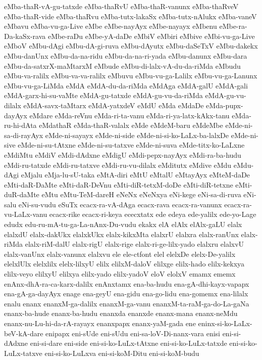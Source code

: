 {eMba-thaR-vA-gu-tatxde
eMba-thaRvU
eMba-thaR-vanunx
eMba-thaRveV
eMba-thaR-vide
eMba-thaRvu
eMba-tutx-lakaSx
eMba-tutx-nAlukx
eMba-vaneV
eMbavu
eMba-vu-ga-Live
eMbe
eMbe-nayAyx
eMbe-nayayx
eMbenu
eMbe-ra-Da-kaSx-rava
eMbe-raDu
eMbe-yA-daDe
eMbiV
eMbiri
eMbive
eMbi-vu-ga-Live
eMboV
eMbu-dAgi
eMbu-dA-gi-ruva
eMbu-dAyutx
eMbu-daSeTxV
eMbu-dakekx
eMbu-danUnx
eMbu-da-na-ridu
eMbu-da-na-ri-yada
eMbu-danunx
eMbu-dara
eMbu-da-satxrX-maMtarxM
eMbude
eMbu-di-lalx-vA-du-da-riMda
eMbudu
eMbu-va-ralilx
eMbu-va-va-ralilx
eMbuvu
eMbu-vu-ga-Lalilx
eMbu-vu-ga-Lanunx
eMbu-vu-ga-LiMda
eMdA
eMdA-du-da-riMda
eMdAga
eMdA-galU
eMdA-gali
eMdA-garx-hi-su-vaMte
eMdA-gu-tatxde
eMdA-gu-vu-da-riMda
eMdA-gu-vu-dilalx
eMdA-savx-taMtarx
eMdA-yatxdeV
eMdU
eMda
eMdaDe
eMda-pupx-dayAyx
eMdare
eMda-reVnu
eMda-ri-ta-vanu
eMda-ri-ya-latx-kAkx-tanu
eMda-ru-hi-dAta
eMdathaR
eMda-thaR-valalx
eMde
eMdeM-baru
eMdeMbe
eMde-ni-sa-di-rayAyx
eMde-ni-sayayx
eMde-ni-side
eMde-ni-si-ko-LaLx-ba-lalxDe
eMde-ni-sive
eMde-ni-su-tAtxne
eMde-ni-su-tatxve
eMde-ni-suva
eMde-titx-ko-LaLxne
eMdiMtu
eMdiV
eMdi-dAdxne
eMdigU
eMdi-pepx-nayAyx
eMdi-ra-ba-hudu
eMdi-ru-tatxde
eMdi-ru-tatxve
eMdi-ru-vu-dilalx
eMditutx
eMdive
eMdu
eMdu-dAgi
eMjalu
eMja-lu-sU-taka
eMtA-diri
eMtU
eMtalU
eMtayAyx
eMteM-daDe
eMti-daR-DaMte
eMti-daR-DeVnu
eMti-diR-tetxM-doDe
eMti-diR-tetxne
eMti-duR-daMte
eMtu
eMtu-TeM-dareH
eNeNx
eNeNxya
eNi-kege
eNi-sa-di-ruva
eNi-salu
eNi-su-vudu
eSuTx
ecacx-ra-vA-dAga
ecacx-rava
ecacx-ra-vanunx
ecacx-ra-vu-LaLx-vanu
ecacx-rike
ecacx-ri-keya
ececxtatx
ede
edeya
ede-yalilx
ede-yo-Lage
edudx
edu-ru-mA-tu-ga-La-nAnx-Du-vudu
ekakx
elA
elAlx
elAlx-gaLU
elalx
elalxdU
elalx-dakUkx
elalxkUkx
elalx-kikxMta
elalxrU
elalxra
elalx-ranUnx
elalx-riMda
elalx-riM-dalU
elalx-rigU
elalx-rige
elalx-ri-ge-lilx-yado
elalxru
elalxvU
elalx-vanUnx
elalx-vanunx
elalxvu
ele
ele-ctfont
elel
elelxDe
elelx-De-yalilx
elelxlUlx
elelxlilx
elelx-lilxyU
elilx
elilxM-daloV
elilxge
elilx-hado
elilx-kekxya
elilx-veyo
elilxyU
elilxya
elilx-yado
elilx-yadoV
eloV
elolxV
emamx
ememx
enAnx-dhA-ra-ca-karx-dalilx
enAnxtamx
ena-ba-hudu
ena-gA-dhi-kayx-vapapx
ena-gA-ga-dayAyx
enage
ena-geyU
ena-gidu
ena-go-lidu
ena-gomemx
ena-lilalx
enalu
enanx
enanxM-ga-dalilx
enanxM-ga-vanu
enanxM-ta-raM-ga-do-La-gaNa
enanx-ba-hude
enanx-ba-hudu
enanxda
enanxde
enanx-mana
enanx-neMdu
enanx-nu-Lu-hi-da-rA-rayayx
enanxpapx
enanx-yaM-gada
ene
eninx-si-ko-LaLx-beV-kA-dare
enipapx
eni-sUde
eni-sUdu
eni-sa-loV-Di-nanx-vara
enisi
eni-si-dAdxne
eni-si-dare
eni-side
eni-si-ko-LuLx-tAtxne
eni-si-ko-LuLx-tatxde
eni-si-ko-LuLx-tatxve
eni-si-ko-LuLxva
eni-si-koM-Ditu
eni-si-koM-budu
}
